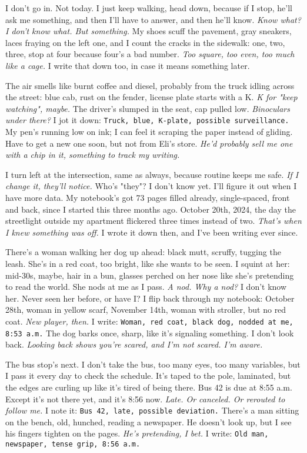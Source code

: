 \documentclass[12pt,oneside]{book}
\newcommand{\note}[1]{\texttt{#1}}
\begin{document}
I don’t go in. Not today. I just keep walking, head down, because if I stop, he’ll ask me something, and then I’ll have to answer, and then he’ll know. \textit{Know what? I don’t know what. But something.} My shoes scuff the pavement, gray sneakers, laces fraying on the left one, and I count the cracks in the sidewalk: one, two, three, stop at four because four’s a bad number. \textit{Too square, too even, too much like a cage.} I write that down too, in case it means something later.

The air smells like burnt coffee and diesel, probably from the truck idling across the street: blue cab, rust on the fender, license plate starts with a K. \textit{K for "keep watching", maybe.} The driver’s slumped in the seat, cap pulled low. \textit{Binoculars under there?} I jot it down: \note{Truck, blue, K-plate, possible surveillance.} My pen’s running low on ink; I can feel it scraping the paper instead of gliding. Have to get a new one soon, but not from \textnormal{Eli}’s store. \textit{He’d probably sell me one with a chip in it, something to track my writing.}

I turn left at the intersection, same as always, because routine keeps me safe. \textit{If I change it, they’ll notice.} Who’s "they"? I don’t know yet. I’ll figure it out when I have more data. My notebook’s got 73 pages filled already, single-spaced, front and back, since I started this three months ago. October 20th, 2024, the day the streetlight outside my apartment flickered three times instead of two. \textit{That’s when I knew something was off.} I wrote it down then, and I’ve been writing ever since.

There’s a woman walking her dog up ahead: black mutt, scruffy, tugging the leash. She’s in a red coat, too bright, like she wants to be seen. I squint at her: mid-30s, maybe, hair in a bun, glasses perched on her nose like she’s pretending to read the world. She nods at me as I pass. \textit{A nod. Why a nod?} I don’t know her. Never seen her before, or have I? I flip back through my notebook: October 28th, woman in yellow scarf, November 14th, woman with stroller, but no red coat. \textit{New player, then.} I write: \note{Woman, red coat, black dog, nodded at me, 8:53 a.m.} The dog barks once, sharp, like it’s signaling something. I don’t look back. \textit{Looking back shows you’re scared, and I’m not scared. I’m aware.}

The bus stop’s next. I don’t take the bus, too many eyes, too many variables, but I pass it every day to check the schedule. It’s taped to the pole, laminated, but the edges are curling up like it’s tired of being there. Bus 42 is due at 8:55 a.m. Except it’s not there yet, and it’s 8:56 now. \textit{Late. Or canceled. Or rerouted to follow me.} I note it: \note{Bus 42, late, possible deviation.} There’s a man sitting on the bench, old, hunched, reading a newspaper. He doesn’t look up, but I see his fingers tighten on the pages. \textit{He’s pretending, I bet.} I write: \note{Old man, newspaper, tense grip, 8:56 a.m.}
\end{document}
